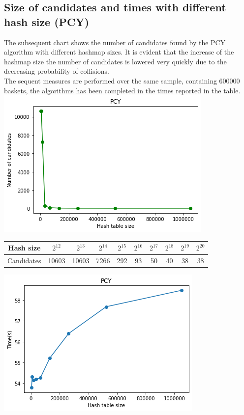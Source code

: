 \documentclass[14pt]{extarticle}
\begin{document}
\subsection{Size of candidates and times with different hash size (PCY)}
The subsequent chart shows the number of candidates found by the PCY algorithm with different hashmap sizes. It is evident that the increase of the hashmap size the number of candidates is lowered very quickly due to the decreasing probability of collisions.\\
The sequent measures are performed over the same sample, containing 600000 baskets, the algorithms has been completed in the times reported in the table.\\
\includegraphics[scale=1]{size_by_hsize.png}\\
\begin{center}
\begin{tabular}{ |c||c|c|c|c|c|c|c|c|c| } 
 \hline
 Hash size & $2^{12}$ & $2^{13}$ & $2^{14}$ & $2^{15}$ & $2^{16}$ & $2^{17}$ & $2^{18}$ & $2^{19}$ & $2^{20}$ \\
 \hline
 Candidates & 10603 & 10603 & 7266 & 292 & 93 & 50 & 40 & 38 & 38\\
 \hline
\end{tabular}
\end{center}
\includegraphics[scale=1]{pcy_hsize_time.png}\\
\end{document}
